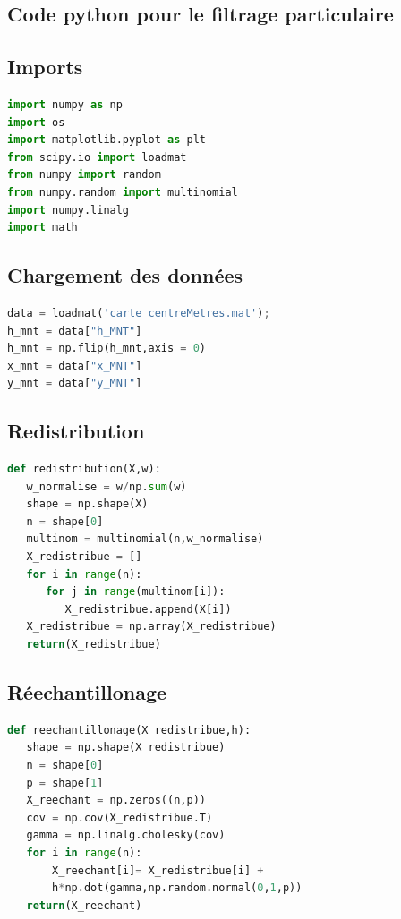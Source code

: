 \documentclass{article}
\begin{document}
\begin{appendices}
\section{Code python pour le filtrage particulaire}

\subsection{Imports}
\begin{lstlisting}[language=Python]
import numpy as np
import os
import matplotlib.pyplot as plt
from scipy.io import loadmat
from numpy import random
from numpy.random import multinomial
import numpy.linalg
import math
\end{lstlisting}

\subsection{Chargement des données}
\begin{lstlisting}[language=Python]
data = loadmat('carte_centreMetres.mat');
h_mnt = data["h_MNT"]
h_mnt = np.flip(h_mnt,axis = 0)
x_mnt = data["x_MNT"]
y_mnt = data["y_MNT"]
\end{lstlisting}


\subsection{Redistribution}
\begin{lstlisting}[language=Python]
def redistribution(X,w):
   w_normalise = w/np.sum(w)
   shape = np.shape(X)
   n = shape[0]
   multinom = multinomial(n,w_normalise)
   X_redistribue = []
   for i in range(n):
      for j in range(multinom[i]):
         X_redistribue.append(X[i]) 
   X_redistribue = np.array(X_redistribue)
   return(X_redistribue)
\end{lstlisting}


\subsection{Réechantillonage}
\begin{lstlisting}[language=Python]
def reechantillonage(X_redistribue,h):
   shape = np.shape(X_redistribue)
   n = shape[0]
   p = shape[1]
   X_reechant = np.zeros((n,p))
   cov = np.cov(X_redistribue.T)
   gamma = np.linalg.cholesky(cov)
   for i in range(n):
       X_reechant[i]= X_redistribue[i] + 
       h*np.dot(gamma,np.random.normal(0,1,p))
   return(X_reechant)
\end{lstlisting}


\end{appendices}
\end{document}
